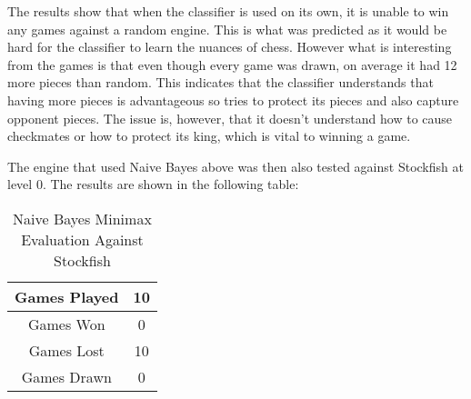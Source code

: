 

The results show that when the classifier is used on its own, it is unable to win any games against a random engine. This is what was predicted as it would be hard for the classifier to learn the nuances of chess. However what is interesting from the games is that even though every game was drawn, on average it had 12 more pieces than random. This indicates that the classifier understands that having more pieces is advantageous so tries to protect its pieces and also capture opponent pieces. The issue is, however, that it doesn't understand how to cause checkmates or how to protect its king, which is vital to winning a game.

The engine that used Naive Bayes above was then also tested against Stockfish at level 0. The results are shown in the following table:

\begin{table}[H]
    \centering
    \begin{tabular}{|c|c|}
    \hline
    Games Played        & 10           \\ \hline
    Games Won           & 0           \\ \hline
    Games Lost          & 10          \\ \hline
    Games Drawn         & 0           \\ \hline
    \end{tabular}
    \caption{Naive Bayes Minimax Evaluation Against Stockfish}
    \label{tab:naive_bayes_minimax_evaluation_stockfish}

\end{table}

